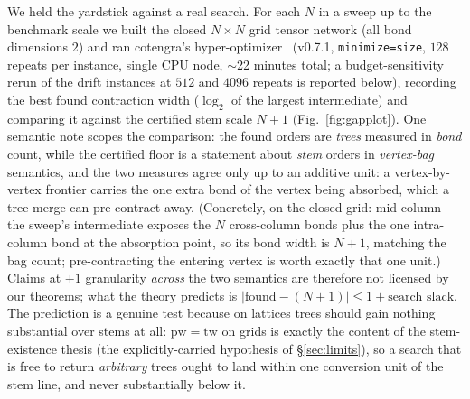 \documentclass[sigplan,10pt,screen,review,anonymous]{acmart}
\newcommand{\pw}{\mathrm{pw}}
\newcommand{\tw}{\mathrm{tw}}
\begin{document}
We held the yardstick against a real search.
For each $N$ in a sweep up to the benchmark scale we built the closed $N\times N$ grid
tensor network (all bond dimensions $2$) and ran cotengra's
hyper-optimizer~\cite{gray2021hyper} (v0.7.1, \texttt{minimize=size}, $128$ repeats per
instance, single CPU node, $\sim$22 minutes total; a budget-sensitivity rerun of the
drift instances at $512$ and $4096$ repeats is reported below), recording the best found
contraction width ($\log_2$ of the largest intermediate) and comparing it against the certified
stem scale $N+1$ (Fig.~\ref{fig:gapplot}). One semantic note scopes the comparison:
the found orders are \emph{trees} measured in \emph{bond} count, while the certified floor
is a statement about \emph{stem} orders in \emph{vertex-bag} semantics, and the two
measures agree only up to an additive unit: a vertex-by-vertex frontier carries the one
extra bond of the vertex being absorbed, which a tree merge can pre-contract away.
(Concretely, on the closed grid: mid-column the sweep's intermediate exposes the $N$
cross-column bonds plus the one intra-column bond at the absorption point, so its bond
width is $N{+}1$, matching the bag count; pre-contracting the entering vertex is worth
exactly that one unit.) Claims
at $\pm 1$ granularity \emph{across} the two semantics are therefore not licensed by our
theorems; what the theory predicts is $|\text{found} - (N{+}1)| \le 1 + \text{search
slack}$. The prediction is a genuine test because on lattices trees should gain nothing
substantial over stems at all: $\pw = \tw$ on grids is exactly the content of the
stem-existence thesis (the explicitly-carried hypothesis of \S\ref{sec:limits}), so a
search that is free to return \emph{arbitrary} trees ought to land within one conversion
unit of the stem line, and never substantially below it.
\end{document}
